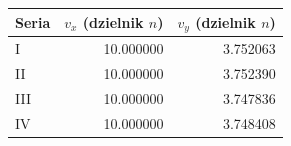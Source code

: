 \begin{tabular}{lrr}
\toprule
Seria & $v_x$ (dzielnik $n$) & $v_y$ (dzielnik $n$) \\
\midrule
I & \num{10.000000} & \num{3.752063} \\
II & \num{10.000000} & \num{3.752390} \\
III & \num{10.000000} & \num{3.747836} \\
IV & \num{10.000000} & \num{3.748408} \\
\bottomrule
\end{tabular}
